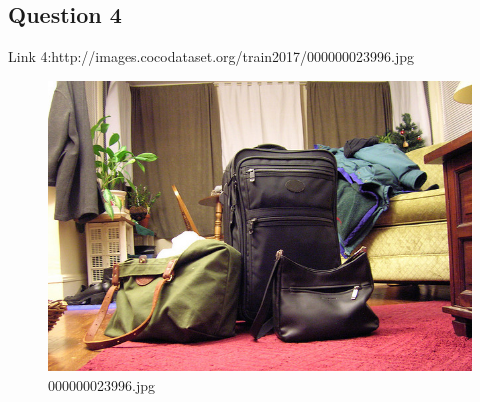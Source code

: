 \subsection{Question 4}
Link 4:http://images.cocodataset.org/train2017/000000023996.jpg
    \begin{figure}[h]
        \centering
        \includegraphics[width=0.8\linewidth]{../image set/easy/000000023996.jpg}
        \caption{000000023996.jpg}
    \end{figure}
